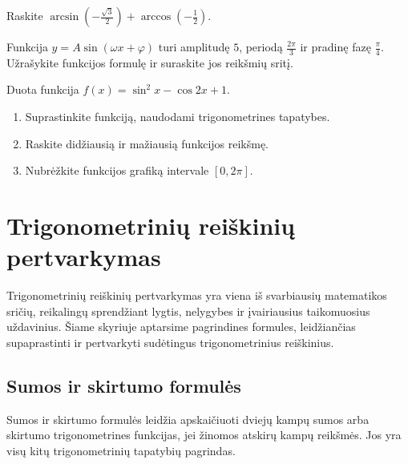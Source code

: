 \begin{exercise}
Raskite \(\arcsin\!\left(-\frac{\sqrt{3}}{2}\right) + \arccos\!\left(-\frac{1}{2}\right)\).
\end{exercise}

\begin{exercise}
Funkcija \(y = A\sin(\omega x + \varphi)\) turi amplitudę \(5\), periodą \(\frac{2\pi}{3}\) ir pradinę fazę \(\frac{\pi}{4}\). Užrašykite funkcijos formulę ir suraskite jos reikšmių sritį.
\end{exercise}

\begin{exercise}
Duota funkcija \(f(x) = \sin^2 x - \cos 2x + 1\).
\begin{enumerate}[label=\alph*)]
    \item Suprastinkite funkciją, naudodami trigonometrines tapatybes.
    \item Raskite didžiausią ir mažiausią funkcijos reikšmę.
    \item Nubrėžkite funkcijos grafiką intervale \([0, 2\pi]\).
\end{enumerate}
\end{exercise}


\section{Trigonometrinių reiškinių pertvarkymas}

Trigonometrinių reiškinių pertvarkymas yra viena iš svarbiausių matematikos
sričių, reikalingų sprendžiant lygtis, nelygybes ir įvairiausius taikomuosius
uždavinius. Šiame skyriuje aptarsime pagrindines formules, leidžiančias
supaprastinti ir pertvarkyti sudėtingus trigonometrinius reiškinius.

\subsection{Sumos ir skirtumo formulės}

Sumos ir skirtumo formulės leidžia apskaičiuoti dviejų kampų sumos arba
skirtumo trigonometrines funkcijas, jei žinomos atskirų kampų reikšmės.
Jos yra visų kitų trigonometrinių tapatybių pagrindas.

